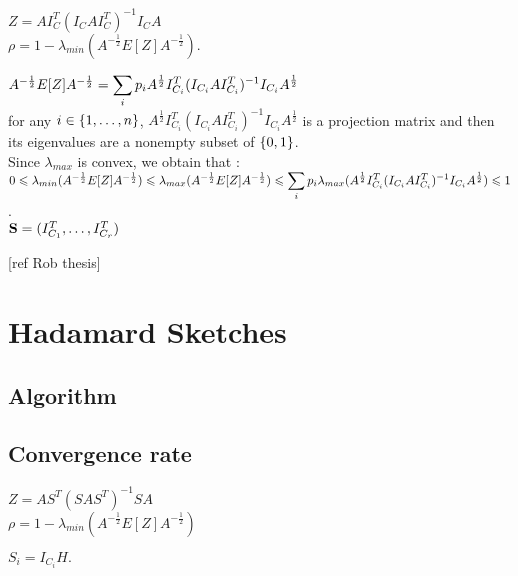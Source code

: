 $Z = A I_{C}^{T} (I_{C} A I_{C}^{T})^{-1} I_{C} A$\\

$\rho = 1 - \lambda_{min}(A^{-\frac12}E[Z]A^{-\frac12}  )$.

$A^{-\frac12}E[Z]A^{-\frac12} = \displaystyle\sum\limits_{i} p_{i} A^{\frac 12} I_{C_{i}}^{T} (I_{C_{i}}  A  I_{C_{i}}^{T})^{-1} I_{C_{i}} A^{\frac 12}$ \\

for any $i \in \left\{1,\dots,n\right\}$, $A^{\frac 12} I_{C_{i}}^{T} (I_{C_{i}}  A  I_{C_{i}}^{T})^{-1} I_{C_{i}} A^{\frac 12}$ is a projection matrix and then its eigenvalues are a nonempty subset of $\left\{0,1\right\}$.\\

Since $\lambda_{max}$ is convex, we obtain that :\\

$0 \leqslant \lambda_{min}(A^{-\frac12}E[Z]A^{-\frac12}) \leqslant  \lambda_{max}(A^{-\frac12}E[Z]A^{-\frac12}) \leqslant \displaystyle\sum\limits_{i} p_{i} \lambda_{max}(A^{\frac 12} I_{C_{i}}^{T} (I_{C_{i}}  A  I_{C_{i}}^{T})^{-1} I_{C_{i}} A^{\frac 12}) \leqslant 1$.\\

$\bold{S} = (I_{C_{1}}^{T},\dots,I_{C_{r}}^{T})$

[ref Rob thesis] 


 
 
 

\chapter{Hadamard Sketches}

%
%
%


\section{Algorithm}


\section{Convergence rate}

$Z = A S^{T} (S A S^{T})^{-1} S A$\\


$\rho = 1 - \lambda_{min}(A^{-\frac12}E[Z]A^{-\frac12}  )$

$S_{i} = I_{C_{i}} H.$\\

